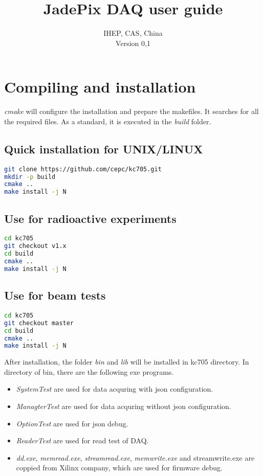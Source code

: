 \documentclass[12pt,a4paper]{article}
\begin{document}
\title{JadePix DAQ user guide}

\author{IHEP, CAS, China \\
\small{Version 0,1}
}

\tableofcontents

\section{Compiling and installation}
\label{compiling-and-installation}

\emph{cmake} will configure the installation and prepare the makefiles.
It searches for all the required files. As a standard, it is executed in
the \emph{build} folder.

\subsection{Quick installation for UNIX/LINUX}

\begin{lstlisting}[language=Bash]
git clone https://github.com/cepc/kc705.git
mkdir -p build
cmake ..
make install -j N
\end{lstlisting}

\subsection{Use for radioactive experiments}
\label{use-for-radioactive-experiments}

\begin{lstlisting}[language=Bash]
cd kc705 
git checkout v1.x
cd build
cmake ..
make install -j N
\end{lstlisting}

\subsection{Use for beam tests}
\label{use-for-beam-tests}

\begin{lstlisting}[language=Bash]
cd kc705 
git checkout master
cd build
cmake ..
make install -j N
\end{lstlisting}

After installation, the folder \emph{bin} and \emph{lib} will be installed in
kc705 directory. In directory of bin, there are the following exe programs.

\begin{itemize}
	\item
	      \emph{SystemTest} are used for data acquring with json configuration.
	\item
	      \emph{ManagterTest} are used for data acquring without json configuration.
	\item
	      \emph{OptionTest} are used for json debug.
	\item
	      \emph{ReaderTest} are used for read test of DAQ.
	\item
		\emph{dd.exe}, \emph{memread.exe}, \emph{streamread.exe}, \emph{memwrite.exe} 
		and streamwrite.exe are coppied from Xilinx company, which are used for firmware 
		debug.
\end{itemize}
\end{document}

